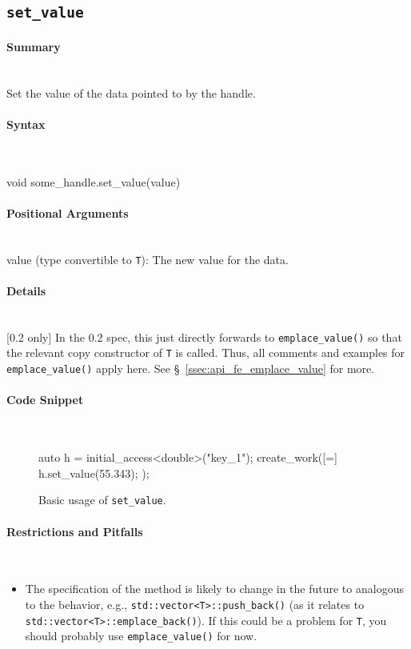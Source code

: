 \subsection{\texttt{set\_value}}

\paragraph{Summary} \mbox{}\\
Set the value of the data pointed to by the handle.

\paragraph{Syntax} \mbox{}\\
\begin{CppCode}
void some_handle.set_value(value)
\end{CppCode}

\paragraph{Positional Arguments}\mbox{}\\
value (type convertible to \texttt{T}): The new value for the data.


\paragraph{Details}\mbox{}\\
{\color{red}[0.2 only]} In the 0.2 spec, this just directly forwards to
\texttt{emplace\_value()} so that the relevant copy constructor of {\tt T} is
called.  Thus, all comments and examples for \texttt{emplace\_value()} apply
here.  See \S~\ref{ssec:api_fe_emplace_value} for more.


\paragraph{Code Snippet}\mbox{}\\
\begin{figure}[!h]
\begin{CppCodeNumb}
auto h = initial_access<double>("key_1");
create_work([=]{
  h.set_value(55.343);
});
\end{CppCodeNumb}
\label{fig:fe_api_set_value}
\caption{Basic usage of \texttt{set\_value}.}
\end{figure}

\paragraph{Restrictions and Pitfalls}\mbox{}\\
\begin{itemize}
  \item The specification of the method is likely to change in the future to
  analogous to the behavior, e.g., \texttt{std::vector<T>::push\_back()} (as it
  relates to \texttt{std::vector<T>::emplace\_back()}).  If this could be a
  problem for \texttt{T}, you should probably use \texttt{emplace\_value()} for now.
\end{itemize}




